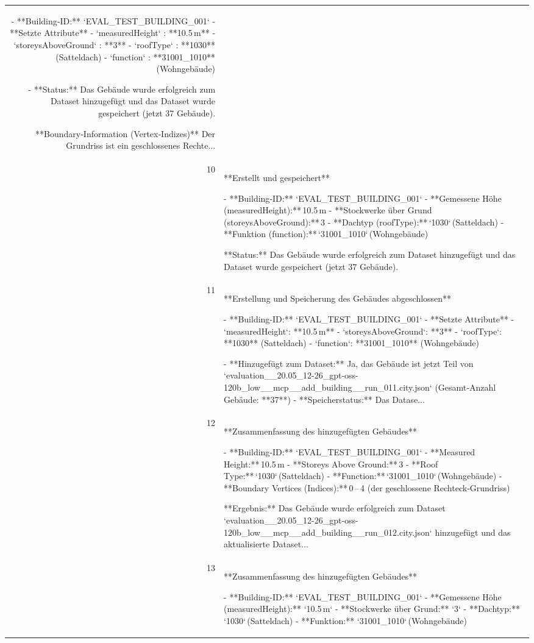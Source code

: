 \documentclass[a4paper,11pt]{article}
\begin{document}
\begin{table}[ht]
\begin{tabular}{r p{12cm}}
- **Building‑ID:** `EVAL\_TEST\_BUILDING\_001`  
- **Setzte Attribute**  
  - `measuredHeight` : **10.5 m**  
  - `storeysAboveGround` : **3**  
  - `roofType` : **1030** (Satteldach)  
  - `function` : **31001\_1010** (Wohngebäude)  

- **Status:** Das Gebäude wurde erfolgreich zum Dataset hinzugefügt und das Dataset wurde gespeichert (jetzt 37 Gebäude).

**Boundary‑Information (Vertex‑Indizes)**  
Der Grundriss ist ein geschlossenes Rechte... \\
10 & **Erstellt und gespeichert**  

- **Building‑ID:** `EVAL\_TEST\_BUILDING\_001`  
- **Gemessene Höhe (measuredHeight):** 10.5 m  
- **Stockwerke über Grund (storeysAboveGround):** 3  
- **Dachtyp (roofType):** `1030` (Satteldach)  
- **Funktion (function):** `31001\_1010` (Wohngebäude)  

**Status:** Das Gebäude wurde erfolgreich zum Dataset hinzugefügt und das Dataset wurde gespeichert (jetzt 37 Gebäude). \\
11 & **Erstellung und Speicherung des Gebäudes abgeschlossen**

- **Building‑ID:** `EVAL\_TEST\_BUILDING\_001`  
- **Setzte Attribute**  
  - `measuredHeight`: **10.5 m**  
  - `storeysAboveGround`: **3**  
  - `roofType`: **1030** (Satteldach)  
  - `function`: **31001\_1010** (Wohngebäude)  

- **Hinzugefügt zum Dataset:** Ja, das Gebäude ist jetzt Teil von `evaluation\_\_20.05\_12-26\_gpt-oss-120b\_low\_\_mcp\_\_add\_building\_\_run\_011.city.json` (Gesamt‑Anzahl Gebäude: **37**)  
- **Speicherstatus:** Das Datase... \\
12 & **Zusammenfassung des hinzugefügten Gebäudes**

- **Building‑ID:** `EVAL\_TEST\_BUILDING\_001`  
- **Measured Height:** 10.5 m  
- **Storeys Above Ground:** 3  
- **Roof Type:** `1030` (Satteldach)  
- **Function:** `31001\_1010` (Wohngebäude)  
- **Boundary Vertices (Indices):** 0 – 4 (der geschlossene Rechteck‑Grundriss)

**Ergebnis:** Das Gebäude wurde erfolgreich zum Dataset `evaluation\_\_20.05\_12-26\_gpt-oss-120b\_low\_\_mcp\_\_add\_building\_\_run\_012.city.json` hinzugefügt und das aktualisierte Dataset... \\
13 & **Zusammenfassung des hinzugefügten Gebäudes**

- **Building‑ID:** `EVAL\_TEST\_BUILDING\_001`  
- **Gemessene Höhe (measuredHeight):** `10.5 m`  
- **Stockwerke über Grund:** `3`  
- **Dachtyp:** `1030` (Satteldach)  
- **Funktion:** `31001\_1010` (Wohngebäude)  


\end{tabular}
\end{table}
\end{document}
